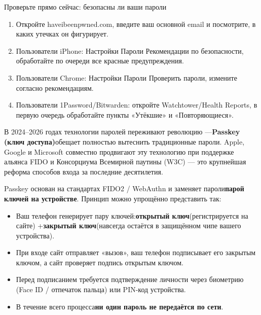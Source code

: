 \begin{tcbpractice}{Проверьте прямо сейчас: безопасны ли ваши пароли}
\begin{enumerate}
  \item Откройте haveibeenpwned.com, введите ваш основной email и посмотрите, в каких утечках он фигурирует.
  \item Пользователи iPhone: Настройки Пароли Рекомендации по безопасности, обработайте по очереди все красные предупреждения.
  \item Пользователи Chrome: Настройки Пароли Проверить пароли, измените согласно рекомендациям.
  \item Пользователи 1Password/Bitwarden: откройте Watchtower/Health Reports, в первую очередь обработайте пункты «Утёкшие» и «Повторяющиеся».
\end{enumerate}

\end{tcbpractice}


В 2024–2026 годах технологии паролей переживают революцию —\textbf{Passkey (ключ доступа)}обещает полностью вытеснить традиционные пароли. Apple, Google и Microsoft совместно продвигают эту технологию при поддержке альянса FIDO и Консорциума Всемирной паутины (W3C) — это крупнейшая реформа способов входа за последние десятилетия.


Passkey основан на стандартах FIDO2 / WebAuthn и заменяет пароли\textbf{парой ключей на устройстве}. Принцип можно упрощённо представить так:

\begin{itemize}
  \item Ваш телефон генерирует пару ключей:\textbf{открытый ключ}(регистрируется на сайте) +\textbf{закрытый ключ}(навсегда остаётся в защищённом чипе вашего устройства).
  \item При входе сайт отправляет «вызов», ваш телефон подписывает его закрытым ключом, а сайт проверяет подпись открытым ключом.
  \item Перед подписанием требуется подтверждение личности через биометрию (Face ID / отпечаток пальца) или PIN-код устройства.
  \item В течение всего процесса\textbf{ни один пароль не передаётся по сети}.
\end{itemize}


